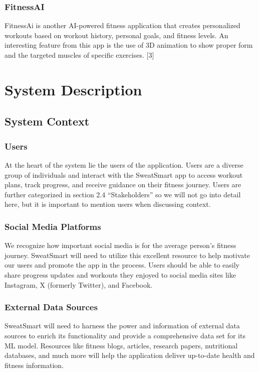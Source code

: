 \documentclass[12pt]{article}
\begin{document}
\subsubsection{FitnessAI}
FitnessAi is another AI-powered fitness application that creates personalized workouts based on workout history, personal goals, and fitness levels. An interesting feature from this app is the use of 3D animation to show proper form and the targeted muscles of specific exercises. [3]


\section{System Description}

\subsection{System Context}

\subsubsection{Users}
At the heart of the system lie the users of the application. Users are a diverse group of individuals and interact with the SweatSmart app to access workout plans, track progress, and receive guidance on their fitness journey. Users are further categorized in section 2.4 “Stakeholders” so we will not go into detail here, but it is important to mention users when discussing context.

\subsubsection{Social Media Platforms}
We recognize how important social media is for the average person’s fitness journey. SweatSmart will need to utilize this excellent resource to help motivate our users and promote the app in the process. Users should be able to easily share progress updates and workouts they enjoyed to social media sites like Instagram, X (formerly Twitter), and Facebook.

\subsubsection{External Data Sources}
SweatSmart will need to harness the power and information of external data sources to enrich its functionality and provide a comprehensive data set for its ML model. Resources like fitness blogs, articles, research papers, nutritional databases, and much more will help the application deliver up-to-date health and fitness information.
\end{document}
